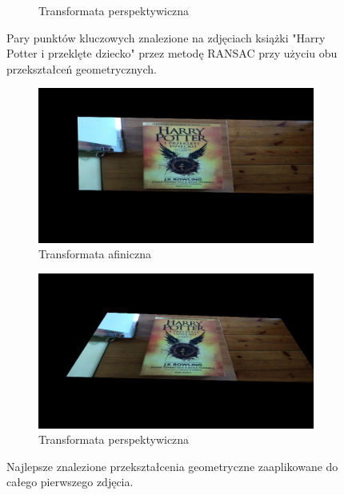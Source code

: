 \documentclass{article}
\begin{document}
\begin{figure}[H]
\begin{subfigure}[b]{0.4\linewidth}
			\caption{Transformata perspektywiczna}
		\end{subfigure}
		\caption{Pary punktów kluczowych znalezione na zdjęciach książki "Harry Potter i przeklęte dziecko" przez metodę RANSAC przy użyciu obu przekształceń geometrycznych.}
		\label{fig:transforms21}
	\end{figure}
	\begin{figure}[H]
		\centering
		\begin{subfigure}[b]{0.4\linewidth}
			\includegraphics[width=\linewidth]{a2-trans.png}
			\caption{Transformata afiniczna}
		\end{subfigure}
		\begin{subfigure}[b]{0.4\linewidth}
			\includegraphics[width=\linewidth]{p2-trans.png}
			\caption{Transformata perspektywiczna}
		\end{subfigure}
		\caption{Najlepsze znalezione przekształcenia geometryczne zaaplikowane do całego pierwszego zdjęcia.}
		\label{fig:transforms22}
	\end{figure}
\end{document}
